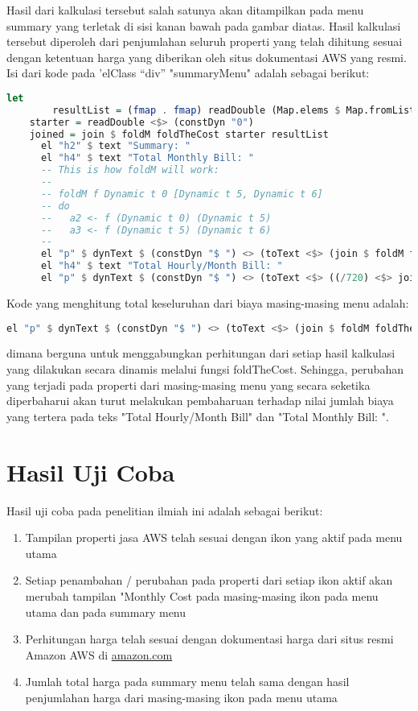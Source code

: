 \documentclass[pi.tex]{subfile}
\begin{document}
   Hasil dari kalkulasi tersebut salah satunya akan ditampilkan pada menu summary yang terletak di sisi kanan bawah pada gambar diatas. Hasil kalkulasi tersebut diperoleh dari penjumlahan seluruh properti yang telah dihitung sesuai dengan ketentuan harga yang diberikan oleh situs dokumentasi AWS yang resmi. Isi dari kode pada 'elClass ``div'' "summaryMenu"  adalah sebagai berikut:
   \begin{lstlisting}[language=Haskell]
let
        resultList = (fmap . fmap) readDouble (Map.elems $ Map.fromList rightM)
	starter = readDouble <$> (constDyn "0")
	joined = join $ foldM foldTheCost starter resultList
      el "h2" $ text "Summary: "
      el "h4" $ text "Total Monthly Bill: "
      -- This is how foldM will work:
      --
      -- foldM f Dynamic t 0 [Dynamic t 5, Dynamic t 6]
      -- do
      --   a2 <- f (Dynamic t 0) (Dynamic t 5)
      --   a3 <- f (Dynamic t 5) (Dynamic t 6)
      --
      el "p" $ dynText $ (constDyn "$ ") <> (toText <$> (join $ foldM foldTheCost starter resultList))
      el "h4" $ text "Total Hourly/Month Bill: "
      el "p" $ dynText $ (constDyn "$ ") <> (toText <$> ((/720) <$> joined))
   \end{lstlisting}
   
  Kode yang menghitung total keseluruhan dari biaya masing-masing menu adalah:
     \begin{lstlisting}[language=Haskell]
  el "p" $ dynText $ (constDyn "$ ") <> (toText <$> (join $ foldM foldTheCost starter resultList))
     \end{lstlisting}
dimana berguna untuk menggabungkan perhitungan dari setiap hasil kalkulasi yang dilakukan secara dinamis melalui fungsi foldTheCost. Sehingga, perubahan yang terjadi pada properti dari masing-masing menu yang secara seketika diperbaharui akan turut melakukan pembaharuan terhadap nilai jumlah biaya yang tertera pada teks "Total Hourly/Month Bill" dan "Total Monthly Bill: ".

     
\section{Hasil Uji Coba}
Hasil uji coba pada penelitian ilmiah ini adalah sebagai berikut:
\begin{enumerate}
\item Tampilan properti jasa AWS telah sesuai dengan ikon yang aktif pada menu utama
\item Setiap penambahan / perubahan pada properti dari setiap ikon aktif akan merubah tampilan "Monthly Cost pada masing-masing ikon pada menu utama dan pada summary menu
\item Perhitungan harga telah sesuai dengan dokumentasi harga dari situs resmi Amazon AWS di \url{amazon.com}
\item Jumlah total harga pada summary menu telah sama dengan hasil penjumlahan harga dari masing-masing ikon pada menu utama
  
\end{enumerate}


     
\end{document}
